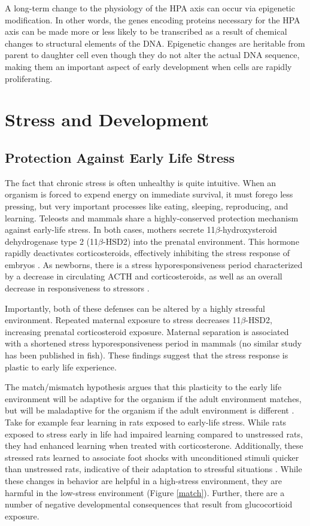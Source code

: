 \documentclass[12pt,twoside]{reedthesis}
\begin{document}
A long-term change to the physiology of the HPA axis can occur via epigenetic
modification. In other words, the genes encoding proteins necessary for the HPA
axis can be made more or less likely to be transcribed as a result of chemical
changes to structural elements of the DNA. Epigenetic changes are heritable from
parent to daughter cell
even though they do not alter the actual DNA sequence, making them an important aspect of early development when cells are rapidly proliferating. 

\section{Stress and Development}
\subsection{Protection Against Early Life Stress} 
The fact that chronic stress is often unhealthy is quite intuitive. When an
organism is forced to expend energy on immediate survival, it must forego less
pressing, but very important processes like eating, sleeping, reproducing, and
learning. Teleosts and mammals share a highly-conserved protection mechanism against
early-life stress. In both cases, mothers secrete 11$\beta$-hydroxysteroid
dehydrogenase type 2 (11$\beta$-HSD2) into the prenatal environment. This hormone rapidly deactivates corticosteroids, effectively
inhibiting the stress response of embryos \citep{van_bodegom_modulation_2017, faught_maternal_2016}. As
newborns, there is a stress hyporesponsiveness period characterized by a
decrease in circulating ACTH and corticosteroids, as well as an overall decrease
in responsiveness to stressors \citep{van_bodegom_modulation_2017, barry_ontogeny_1995}.

Importantly, both of these defenses can be altered by a highly stressful
environment. Repeated maternal exposure to stress decreases 11$\beta$-HSD2,
increasing prenatal corticosteroid exposure. Maternal separation is
associated with a shortened stress hyporesponsiveness period in mammals (no
similar study has been published in fish). These findings suggest that the stress
response is plastic to early life experience.

The match/mismatch hypothesis
argues that this plasticity to the early life environment will be adaptive for
the organism if the adult environment matches, but will be maladaptive for the
organism if the adult environment is different \citep{gluckman_early_2007}. Take
for example fear learning in rats exposed to early-life stress. While rats
exposed to stress early in life had impaired learning compared to unstressed rats,
they had enhanced learning when treated with corticosterone. Additionally, these
stressed rats learned to associate foot shocks with unconditioned
stimuli quicker than unstressed rats, indicative of their adaptation to
stressful situations \citep{champagne_maternal_2008}. While these changes in
behavior are helpful in a high-stress environment, they are
harmful in the low-stress environment (Figure \ref{match}). Further, there
 are a number of negative developmental consequences that result from glucocortioid exposure.   
\end{document}

